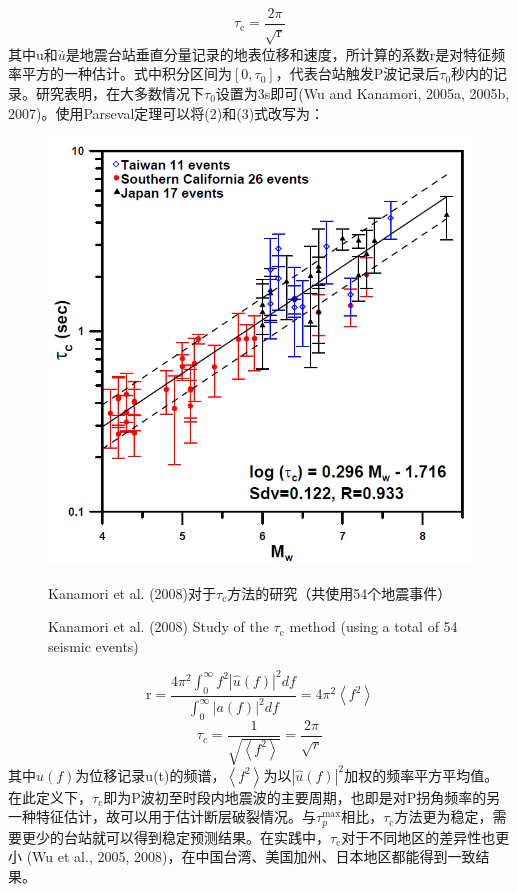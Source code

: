 \begin{equation}
\tau_{\mathrm{c}}=\frac{2 \pi}{\sqrt{\mathrm{r}}}
\end{equation}
其中u和$\dot{u}$̇是地震台站垂直分量记录的地表位移和速度，所计算的系数r是对特征频率平方的一种估计。式中积分区间为$\left[0, \tau_{0}\right]$，代表台站触发P波记录后$\tau_{0}$秒内的记录。研究表明，在大多数情况下$\tau_{0}$设置为3s即可(Wu and Kanamori, 2005a, 2005b, 2007)。使用Parseval定理可以将(2)和(3)式改写为：
\begin{figure}[!h] 
\centering 
 \includegraphics[width=0.7\linewidth]{img/kanamori2008_taoc.jpg} 
 \renewcommand{\figurename}{图} 
\caption{Kanamori et al. (2008)对于$\tau_{\mathrm{c}}$方法的研究（共使用54个地震事件）} 
\addtocounter{figure}{-1} \vspace{-5pt} 
\renewcommand{\figurename}{Fig} 
\caption{Kanamori et al. (2008) Study of the $\tau_{\mathrm{c}}$ method (using a total of 54 seismic events)} 
\renewcommand{\figurename}{图} 
\label{fig:network-device-influence.png} 
\end{figure}

\begin{equation}
\mathrm{r}=\frac{4 \pi^{2} \int_{0}^{\infty} f^{2}|\widehat{u}(f)|^{2} d f}{\int_{0}^{\infty}|a(f)|^{2} d f}=4 \pi^{2}\left\langle f^{2}\right\rangle
\end{equation}
\begin{equation}
\tau_{c}=\frac{1}{\sqrt{\left\langle f^{2}\right\rangle}}=\frac{2 \pi}{\sqrt{r}}
\end{equation}
其中$\widehat{u}(f)$为位移记录u(t)的频谱，$\left\langle f^{2}\right\rangle$为以$|\hat{u}(f)|^{2}$加权的频率平方平均值。在此定义下，$\tau_{\mathrm{c}}$即为P波初至时段内地震波的主要周期，也即是对P拐角频率的另一种特征估计，故可以用于估计断层破裂情况。与$\tau_{p}^{\max}$相比，$\tau_{\mathrm{c}}$方法更为稳定，需要更少的台站就可以得到稳定预测结果。在实践中，$\tau_{\mathrm{c}}$对于不同地区的差异性也更小 (Wu et al., 2005, 2008)，在中国台湾、美国加州、日本地区都能得到一致结果。\\

